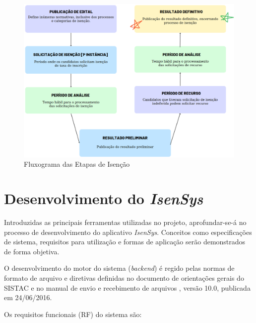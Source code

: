 \documentclass[
	12pt,			%
	openright,		%
	oneside,	
	a4paper,		%
	english,		%
	brazil			%
]{abntex2/abntex2}  %
\begin{document}
			\begin{figure}[H]
				\begin{center}
					
					\caption{Fluxograma das Etapas de Isenção}
					\label{isencao-fluxograma}
					
					\includegraphics[scale=0.34]{img/isencao-fluxograma}
					
				\end{center}
			\end{figure}

	\chapter{Desenvolvimento do \textit{IsenSys}} \label{cap3-desenvolvimento}

		Introduzidas as principais ferramentas utilizadas no projeto, aprofundar-se-á no processo de desenvolvimento do aplicativo \textit{IsenSys}. Conceitos como especificações de sistema, requisitos para utilização e formas de aplicação serão demonstrados de forma objetiva.
		
		O desenvolvimento do motor do sistema (\textit{backend}) é regido pelas normas de formato de arquivo e diretivas definidas no documento de orientações gerais do SISTAC \cite{sistac-gerais} e no manual de envio e recebimento de arquivos \cite{sistac-formatos}, versão 10.0, publicada em 24/06/2016.
		
		Os requisitos funcionais (RF) do sistema são:
	
\end{document}
